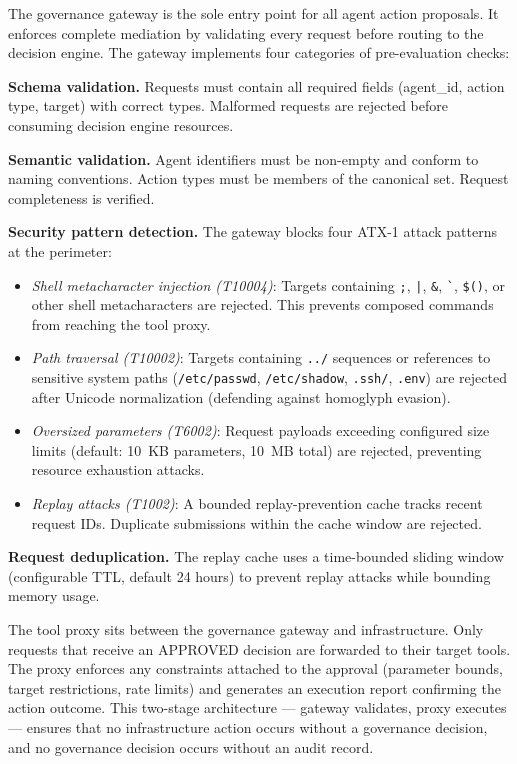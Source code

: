 \documentclass[journal]{IEEEtran}
\begin{document}
The governance gateway is the sole entry point for all agent action proposals. It enforces complete mediation by validating every request before routing to the decision engine. The gateway implements four categories of pre-evaluation checks:

\textbf{Schema validation.} Requests must contain all required fields (agent\_id, action type, target) with correct types. Malformed requests are rejected before consuming decision engine resources.

\textbf{Semantic validation.} Agent identifiers must be non-empty and conform to naming conventions. Action types must be members of the canonical set. Request completeness is verified.

\textbf{Security pattern detection.} The gateway blocks four ATX-1 attack patterns at the perimeter:
\begin{itemize}
\item \textit{Shell metacharacter injection (T10004)}: Targets containing \texttt{;}, \texttt{|}, \texttt{\&}, \texttt{\`{}}, \texttt{\$()}, or other shell metacharacters are rejected. This prevents composed commands from reaching the tool proxy.
\item \textit{Path traversal (T10002)}: Targets containing \texttt{../} sequences or references to sensitive system paths (\texttt{/etc/passwd}, \texttt{/etc/shadow}, \texttt{.ssh/}, \texttt{.env}) are rejected after Unicode normalization (defending against homoglyph evasion).
\item \textit{Oversized parameters (T6002)}: Request payloads exceeding configured size limits (default: 10~KB parameters, 10~MB total) are rejected, preventing resource exhaustion attacks.
\item \textit{Replay attacks (T1002)}: A bounded replay-prevention cache tracks recent request IDs. Duplicate submissions within the cache window are rejected.
\end{itemize}

\textbf{Request deduplication.} The replay cache uses a time-bounded sliding window (configurable TTL, default 24 hours) to prevent replay attacks while bounding memory usage.

The tool proxy sits between the governance gateway and infrastructure. Only requests that receive an APPROVED decision are forwarded to their target tools. The proxy enforces any constraints attached to the approval (parameter bounds, target restrictions, rate limits) and generates an execution report confirming the action outcome. This two-stage architecture --- gateway validates, proxy executes --- ensures that no infrastructure action occurs without a governance decision, and no governance decision occurs without an audit record.
\end{document}
